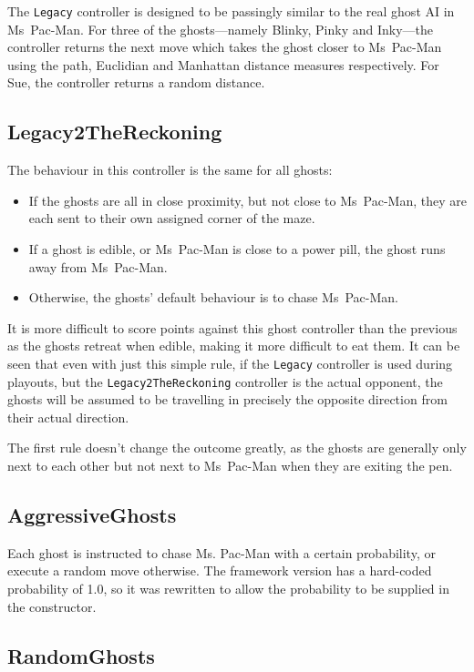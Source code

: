 The {\tt Legacy} controller is designed to be passingly similar to the real ghost AI in Ms~Pac-Man.  For three of the ghosts---namely Blinky, Pinky and Inky---the controller returns the next move which takes the ghost closer to Ms~Pac-Man using the path, Euclidian and Manhattan distance measures respectively.  For Sue, the controller returns a random distance.

\subsection{Legacy2TheReckoning}

The behaviour in this controller is the same for all ghosts:

\begin{itemize}
\item If the ghosts are all in close proximity, but not close to Ms~Pac-Man, they are each sent to their own assigned corner of the maze.
\item If a ghost is edible, or Ms~Pac-Man is close to a power pill, the ghost runs away from Ms~Pac-Man.
\item Otherwise, the ghosts' default behaviour is to chase Ms~Pac-Man.
\end{itemize}

It is more difficult to score points against this ghost controller than the previous as the ghosts retreat when edible, making it more difficult to eat them.  It can be seen that even with just this simple rule, if the {\tt Legacy} controller is used during playouts, but the {\tt Legacy2TheReckoning} controller is the actual opponent, the ghosts will be assumed to be travelling in precisely the opposite direction from their actual direction.

The first rule doesn't change the outcome greatly, as the ghosts are generally only next to each other but not next to Ms~Pac-Man when they are exiting the pen.

\subsection{AggressiveGhosts}

Each ghost is instructed to chase Ms. Pac-Man with a certain probability, or execute a random move otherwise.  The framework version has a hard-coded probability of 1.0, so it was rewritten to allow the probability to be supplied in the constructor.

\subsection{RandomGhosts}

